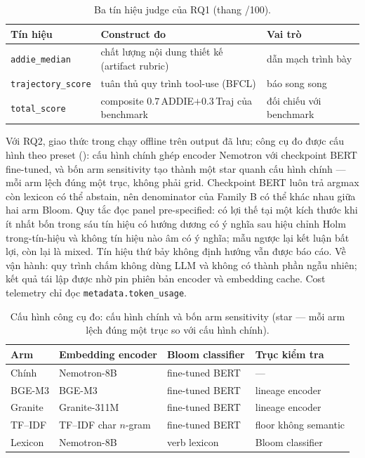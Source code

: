 \begin{table}[t]
  \caption{Ba tín hiệu judge của RQ1 (thang /100).}
  \label{tab:judge-signals}
  \small
  \begin{tabular}{@{}lp{}p{}@{}}
    \toprule
    Tín hiệu & Construct đo & Vai trò \\
    \midrule
    \texttt{addie\_median} & chất lượng nội dung thiết kế (artifact rubric) &
    dẫn mạch trình bày \\
    \texttt{trajectory\_score} & tuân thủ quy trình tool-use (BFCL) &
    báo song song \\
    \texttt{total\_score} & composite $0.7\,$ADDIE$+0.3\,$Traj của benchmark &
    đối chiếu với benchmark \\
    \bottomrule
  \end{tabular}
\end{table}

Với RQ2, giao thức trong  chạy offline trên output đã lưu;
công cụ đo được cấu hình theo preset (): cấu hình chính ghép
encoder Nemotron với checkpoint BERT fine-tuned, và bốn arm sensitivity tạo thành một
star quanh cấu hình chính --- mỗi arm lệch đúng một trục, không phải grid.
Checkpoint BERT luôn trả argmax còn lexicon có thể abstain, nên denominator của
Family B có thể khác nhau giữa hai arm Bloom. Quy tắc đọc panel pre-specified: có
lợi thế tại một kích thước khi ít nhất bốn trong sáu tín hiệu có hướng dương có ý
nghĩa sau hiệu chỉnh Holm trong-tín-hiệu và không tín hiệu nào âm có ý nghĩa; mẫu
ngược lại kết luận bất lợi, còn lại là mixed. Tín hiệu thứ bảy không định hướng
vẫn được báo cáo. Về vận hành: quy trình chấm không dùng LLM và không có thành phần ngẫu nhiên; kết quả tái lập được nhờ pin phiên bản encoder và embedding cache.
Cost telemetry chỉ đọc \texttt{metadata.token\_usage}.

\begin{table}[t]
  \caption{Cấu hình công cụ đo: cấu hình chính và bốn arm sensitivity (star ---
  mỗi arm lệch đúng một trục so với cấu hình chính).}
  \label{tab:rq2-arms}
  \small
  \begin{tabular}{@{}lllp{}@{}}
    \toprule
    Arm & Embedding encoder & Bloom classifier & Trục kiểm tra \\
    \midrule
    Chính & Nemotron-8B~\cite{babakhin2025nemotron} &
    fine-tuned BERT~\cite{li2022bloomclassification} & --- \\
    BGE-M3 & BGE-M3~\cite{chen2024m3embedding} & fine-tuned BERT & lineage encoder \\
    Granite & Granite-311M~\cite{awasthy2026granite} & fine-tuned BERT & lineage encoder \\
    TF--IDF & TF--IDF char $n$-gram & fine-tuned BERT & floor không semantic \\
    Lexicon & Nemotron-8B & verb lexicon~\cite{anderson2001taxonomy} &
    Bloom classifier \\
    \bottomrule
  \end{tabular}
\end{table}

